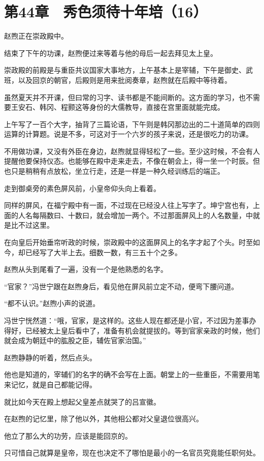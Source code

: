 \section{第44章　秀色须待十年培（16）}

赵煦正在崇政殿中。

结束了下午的功课，赵煦便过来等着与他的母后一起去拜见太上皇。

崇政殿的前殿是与重臣共议国家大事地方，上午基本上是宰辅，下午是御史、武班，以及回京的朝官，后殿则是用来批阅奏章，赵煦就在后殿中等待着。

虽然夏天并不开课，但曰常的习字、读书都是不能间断的。这方面的学习，也不需要王安石、韩冈、程颢这等身份的大儒教导，直接在宫里面就能完成。

上午写了一百个大字，抽背了三篇论语，下午则是韩冈那边出的二十道简单的四则运算的计算题。说是不多，可这对于一个六岁的孩子来说，还是很吃力的功课。

不用做功课，又没有外臣在身边，赵煦就显得轻松了一些。至少这时候，不会有人提醒他要保持仪态。也能够在殿中走来走去，不像在朝会上，得一坐一个时辰。但也只是稍稍有点放松，坐立行走，还是一样是一种久经训练后的端正。

走到御桌旁的素色屏风前，小皇帝仰头向上看着。

同样的屏风，在福宁殿中有一面，不过现在已经没人往上写字了。坤宁宫也有，上面的人名每隔数曰、十数曰，就会增加一两个。不过那面屏风上的人名数量，中就是比不过这里。

在向皇后开始垂帘听政的时候，崇政殿中的这面屏风上的名字才起了个头。时至如今，却已经写了大半上去。细数一数，有三五十个之多。

赵煦从头到尾看了一遍，没有一个是他熟悉的名字。

“官家？”冯世宁跟在赵煦身后，看见他在屏风前立定不动，便弯下腰问道。

“都不认识。”赵煦小声的说道。

冯世宁恍然道：“哦，官家，是这样的。这些人现在都还是小官，不过因为差事办得好，已经被太上皇后看中了，准备有机会就提拔的。等到官家亲政的时候，他们就会成为朝廷中的肱股之臣，辅佐官家治国。”

赵煦静静的听着，然后点头。

他也是知道的，宰辅们的名字的确不会写在上面。朝堂上的一些重臣，不需要用笔来记忆，就是自己都能记得。

就比如今天在殿上想起父皇差点就哭了的吕宣徽。

在赵煦的记忆里，除了他以外，其他相公都对父皇退位很高兴。

他立了那么大的功劳，应该是能回京的。

只可惜自己就算是皇帝，现在也决定不了哪怕是最小的一名官员究竟能任职何处。

